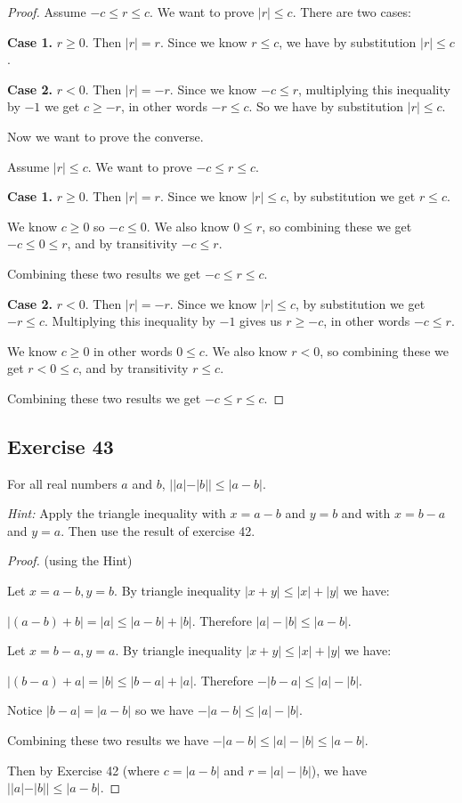 \documentclass[14pt]{extarticle}
\begin{document}
\begin{proof}
Assume $-c \leq r \leq c$. We want to prove $|r| \leq c$. There are two cases:

{\bf Case 1.} $r \geq 0$. Then $|r| = r$. Since we know $r \leq c$, we have by substitution $|r| \leq c$.

{\bf Case 2.} $r < 0$. Then $|r| = -r$. Since we know $-c \leq r$, multiplying this inequality by $-1$ we get $c \geq -r$, in other words $-r \leq c$. So we have by substitution $|r| \leq c$.

Now we want to prove the converse.

Assume $|r| \leq c$. We want to prove $-c \leq r \leq c$.

{\bf Case 1.} $r \geq 0$. Then $|r| = r$. Since we know $|r| \leq c$, by substitution we get $r \leq c$. 

We know $c \geq 0$ so $-c \leq 0$. We also know $0 \leq r$, so combining these we get $-c \leq 0 \leq r$, and by transitivity $-c \leq r$.

Combining these two results we get $-c \leq r \leq c$.

{\bf Case 2.} $r < 0$. Then $|r| = -r$.  Since we know $|r| \leq c$, by substitution we get $-r \leq c$. Multiplying this inequality by $-1$ gives us $r \geq -c$, in other words $-c \leq r$.

We know $c \geq 0$ in other words $0 \leq c$. We also know $r < 0$, so combining these we get $r < 0 \leq c$, and by transitivity $r \leq c$.

Combining these two results we get $-c \leq r \leq c$.
\end{proof}

\subsection{Exercise 43}
For all real numbers $a$ and $b$, $||a| - |b|| \leq |a - b|$.

{\it Hint:} Apply the triangle inequality with $x = a - b$ and $y = b$ and with $x = b - a$ and $y = a$. Then use the result of exercise 42.

\begin{proof}
(using the Hint)

Let $x = a-b, y = b$. By triangle inequality $|x+y| \leq |x|+ |y|$ we have: 

$|(a-b)+b| = |a| \leq |a-b|+|b|$. Therefore $|a| - |b| \leq |a-b|$.

Let $x = b-a, y = a$. By triangle inequality $|x+y| \leq |x|+ |y|$ we have: 

$|(b-a)+a| = |b| \leq |b-a|+|a|$. Therefore $-|b-a| \leq |a| - |b|$.

Notice $|b-a| = |a-b|$ so we have $-|a-b| \leq |a| - |b|$.

Combining these two results we have $-|a-b| \leq |a| - |b| \leq |a-b|$.

Then by Exercise 42 (where $c = |a-b|$ and $r = |a| - |b|$), we have $||a| - |b|| \leq |a-b|$.
\end{proof}
\end{document}
